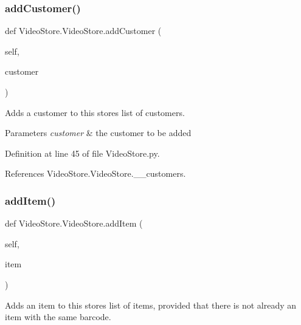 \mbox{\label{classVideoStore_1_1VideoStore_a9580d5be76ce527ceef595dc600ff92c}} 
\subsubsection{\texorpdfstring{add\+Customer()}{addCustomer()}}
{\footnotesize\ttfamily def Video\+Store.\+Video\+Store.\+add\+Customer (\begin{DoxyParamCaption}\item[{}]{self,  }\item[{}]{customer }\end{DoxyParamCaption})}



Adds a customer to this store\textquotesingle{}s list of customers. 


\begin{DoxyParams}{Parameters}
{\em customer} & the customer to be added \\
\hline
\end{DoxyParams}


Definition at line 45 of file Video\+Store.\+py.



References Video\+Store.\+Video\+Store.\+\_\+\+\_\+customers.

\mbox{\label{classVideoStore_1_1VideoStore_ad34e486af714a9513bff371d77b5dbbf}} 
\subsubsection{\texorpdfstring{add\+Item()}{addItem()}}
{\footnotesize\ttfamily def Video\+Store.\+Video\+Store.\+add\+Item (\begin{DoxyParamCaption}\item[{}]{self,  }\item[{}]{item }\end{DoxyParamCaption})}



Adds an item to this store\textquotesingle{}s list of items, provided that there is not already an item with the same barcode. 


